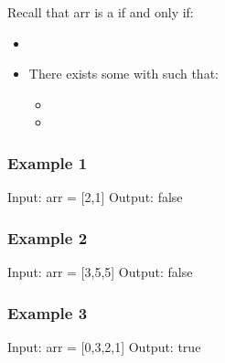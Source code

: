 \documentclass[letterpaper,12pt,english]{book}
\begin{document}
\sphinxAtStartPar
Recall that arr is a  if and only if:
\begin{itemize}
\item {} 
\sphinxAtStartPar
{}

\item {} 
\sphinxAtStartPar
There exists some  with  such that:
\begin{itemize}
\item {} 
\sphinxAtStartPar
{}

\item {} 
\sphinxAtStartPar
{}

\end{itemize}

\end{itemize}

\sphinxAtStartPar
{}


\subsubsection{Example 1}
\label{\detokenize{Array/01_ARR_941_Valid_Mountain_Array:example-1}}
\begin{sphinxVerbatim}[commandchars=\\\{\}]
Input: arr = [2,1]
Output: false
\end{sphinxVerbatim}


\subsubsection{Example 2}
\label{\detokenize{Array/01_ARR_941_Valid_Mountain_Array:example-2}}
\begin{sphinxVerbatim}[commandchars=\\\{\}]
Input: arr = [3,5,5]
Output: false
\end{sphinxVerbatim}


\subsubsection{Example 3}
\label{\detokenize{Array/01_ARR_941_Valid_Mountain_Array:example-3}}
\begin{sphinxVerbatim}[commandchars=\\\{\}]
Input: arr = [0,3,2,1]
Output: true
\end{sphinxVerbatim}
\end{document}
